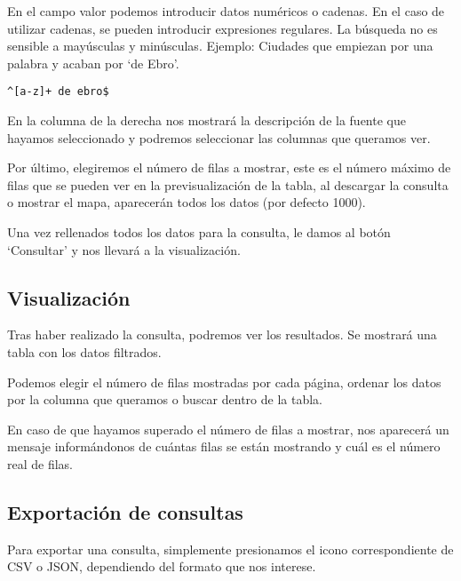 En el campo valor podemos introducir datos numéricos o cadenas. En el caso de utilizar cadenas, se pueden introducir expresiones regulares. La búsqueda no es sensible a mayúsculas y minúsculas. Ejemplo: Ciudades que empiezan por una palabra y acaban por `de Ebro'.

\begin{lstlisting}
^[a-z]+ de ebro$
\end{lstlisting}

En la columna de la derecha nos mostrará la descripción de la fuente que hayamos seleccionado y podremos seleccionar las columnas que queramos ver.

Por último, elegiremos el número de filas a mostrar, este es el número máximo de filas que se pueden ver en la previsualización de la tabla, al descargar la consulta o mostrar el mapa, aparecerán todos los datos (por defecto 1000).


Una vez rellenados todos los datos para la consulta, le damos al botón `Consultar' y nos llevará a la visualización.

\subsection{Visualización} \label{visualizacion}

Tras haber realizado la consulta, podremos ver los resultados. Se mostrará una tabla con los datos filtrados.

Podemos elegir el número de filas mostradas por cada página, ordenar los datos por la columna que queramos o buscar dentro de la tabla. 


En caso de que hayamos superado el número de filas a mostrar, nos aparecerá un mensaje informándonos de cuántas filas se están mostrando y cuál es el número real de filas.


\subsection{Exportación de consultas} \label{exportar}

Para exportar una consulta, simplemente presionamos el icono correspondiente de CSV o JSON, dependiendo del formato que nos interese.

